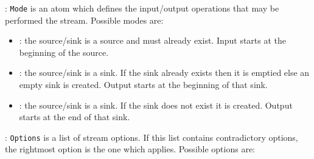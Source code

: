 : \texttt{Mode} is an atom which defines the
input/output operations that may be performed the stream. Possible modes
are:

\begin{itemize}

\item {}: the source/sink is a source and must already exist.
Input starts at the beginning of the source.

\item {}: the source/sink is a sink. If the sink already exists
then it is emptied else an empty sink is created. Output starts at the
beginning of that sink.

\item {}: the source/sink is a sink. If the sink does not exist
it is created. Output starts at the end of that sink.

\end{itemize}

: \texttt{Options} is a list of stream options. If
this list contains contradictory options, the rightmost option is the one
which applies. Possible options are:

